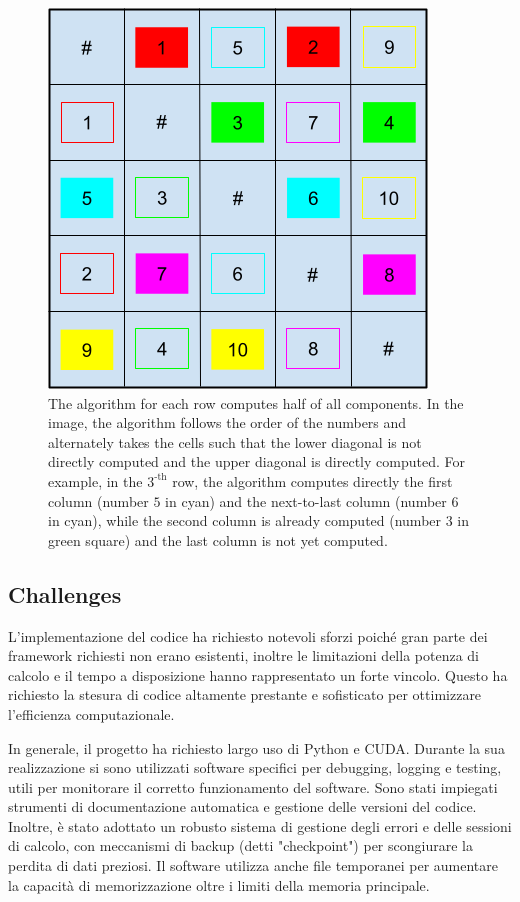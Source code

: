 \begin{toDo}
	\begin{figure}[H]
		\centering
		\includegraphics[width=0.7\linewidth]{Figures/analysis_sort.png}
		\caption[Visit all couples]{The algorithm for each row computes half of all components. In the image, the algorithm follows the order of the numbers and alternately takes the cells such that the lower diagonal is not directly computed and the upper diagonal is directly computed. For example, in the $3^\text{-th}$ row, the algorithm computes directly the first column (number $5$ in cyan) and the next-to-last column (number $6$ in cyan), while the second column is already computed (number $3$ in green square) and the last column is not yet computed.}
		\label{fig:distance_computation}
	\end{figure}

	\subsection{Challenges}
	L'implementazione del codice ha richiesto notevoli sforzi poiché gran parte dei framework richiesti non erano esistenti, inoltre le limitazioni della potenza di calcolo e il tempo a disposizione hanno rappresentato un forte vincolo. Questo ha richiesto la stesura di codice altamente prestante e sofisticato per ottimizzare l'efficienza computazionale.

	\noindent In generale, il progetto ha richiesto largo uso di \gls{Python} e \gls{CUDA}. Durante la sua realizzazione si sono utilizzati software specifici per debugging, logging e testing, utili per monitorare il corretto funzionamento del software. Sono stati impiegati strumenti di documentazione automatica e gestione delle versioni del codice. Inoltre, è stato adottato un robusto sistema di gestione degli errori e delle sessioni di calcolo, con meccanismi di backup (detti "checkpoint") per scongiurare la perdita di dati preziosi. Il software utilizza anche file temporanei per aumentare la capacità di memorizzazione oltre i limiti della memoria principale.


\end{toDo}
